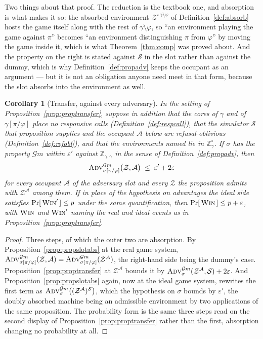 \documentclass[11pt,a4paper]{article}
\newcommand{\Zenv}{\mathcal{Z}}
\newcommand{\Adv}{\mathcal{A}}
\newcommand{\Sim}{\mathcal{S}}
\newcommand{\advtg}{\op{Adv}}
\newcommand{\ZenvSet}{\mathbb{Z}}
\newcommand{\op}[1]{\textsc{#1}}
\newcommand{\Gm}{\mathcal{G}m}
\newcommand{\Win}{\op{Win}}
\theoremstyle{accentdef}
\theoremstyle{accentplain}
\newtheorem{corollary}[definition]{Corollary}
\begin{document}
Two things about that proof. The reduction is the textbook one, and absorption is what makes it so: the
absorbed environment $\Zenv^{\star\,\gamma \setminus \varphi}$ of Definition~\ref{def:absorb} hosts
the game itself along with the rest of $\gamma \setminus \varphi$, so ``an environment playing the game
against $\pi$'' becomes ``an environment distinguishing $\pi$ from $\varphi$'' by moving the game
inside it, which is what Theorem~\ref{thm:comp} was proved about. And the property on the right is
stated against $\Sim$ in the slot rather than against the dummy, which is why
Definition~\ref{def:propadv} keeps the occupant as an argument --- but it is not an obligation anyone
need meet in that form, because the slot absorbs into the environment as well.

\begin{corollary}[Transfer, against every adversary]\label{cor:proptransfer2}
In the setting of Proposition~\ref{prop:proptransfer}, suppose in addition that the cores of $\gamma$
and of $\gamma[\pi/\varphi]$ place no responsive calls (Definition~\ref{def:respcall}), that the
simulator $\Sim$ that proposition supplies and the occupant $\Adv$ below are refusal-oblivious
(Definition~\ref{def:refobl}), and that the environments named lie in $\ZenvSet^{\circ}_{\gamma}$. If
$\sigma$ has the property $\Gm$ within $\varepsilon'$ against $\ZenvSet_{\gamma,\gamma}$ in the sense
of Definition~\ref{def:propadv}, then
\[
  \advtg^{\Gm}_{\sigma[\pi/\varphi]}\bigl(\Zenv,\Adv\bigr) \;\leq\; \varepsilon' + 2\varepsilon
\]
for every occupant $\Adv$ of the adversary slot and every $\Zenv$ the proposition admits with
$\Zenv^{\Adv}$ among them. If in place of the hypothesis on advantages the ideal side satisfies
$\Pr[\,\Win'\,] \leq p$ under the same quantification, then $\Pr[\,\Win\,] \leq p + \varepsilon$, with
$\Win$ and $\Win'$ naming the real and ideal events as in Proposition~\ref{prop:proptransfer}.
\end{corollary}

\begin{proof}
Three steps, of which the outer two are absorption. By
Proposition~\ref{prop:propslotabs} at the real game system,
$\advtg^{\Gm}_{\sigma[\pi/\varphi]}(\Zenv,\Adv) = \advtg^{\Gm}_{\sigma[\pi/\varphi]}(\Zenv^{\Adv})$,
the right-hand side being the dummy's case. Proposition~\ref{prop:proptransfer} at $\Zenv^{\Adv}$
bounds it by $\advtg^{\Gm}_{\sigma}(\Zenv^{\Adv},\Sim) + 2\varepsilon$. And
Proposition~\ref{prop:propslotabs} again, now at the ideal game system, rewrites the first term as
$\advtg^{\Gm}_{\sigma}\bigl((\Zenv^{\Adv})^{\Sim}\bigr)$, which the hypothesis on $\sigma$ bounds by
$\varepsilon'$, the doubly absorbed machine being an admissible environment by two applications of the
same proposition. The probability form is the same three steps read on the second display of
Proposition~\ref{prop:proptransfer} rather than the first, absorption changing no probability at all.
\end{proof}
\end{document}
